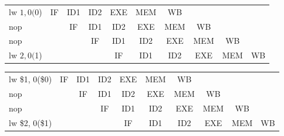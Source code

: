 \documentclass[pdftex,12pt,a4paper]{report}
\begin{document}
\begin{table}[!htb]
\centering
\label{my-label}
\begin{tabular}{lccc|c|c|c|ccc}
\cline{2-7}
\multicolumn{1}{l|}{lw $1, 0($0)} & \multicolumn{1}{c|}{IF} & \multicolumn{1}{c|}{ID1} & ID2 & EXE & \cellcolor[HTML]{F8A102}MEM & \cellcolor[HTML]{FFCC67}WB  &                          &                          &                         \\ \cline{2-8}
nop                               & \multicolumn{1}{c|}{}   & \multicolumn{1}{c|}{IF}  & ID1 & ID2 & EXE                         & MEM                         & \multicolumn{1}{c|}{WB}  &                          &                         \\ \cline{3-9}
nop                               &                         & \multicolumn{1}{c|}{}    & IF  & ID1 & ID2                         & EXE                         & \multicolumn{1}{c|}{MEM} & \multicolumn{1}{c|}{WB}  &                         \\ \cline{4-10} 
lw $2, 0($1)                      &                         &                          &     & IF  & ID1                         & \cellcolor[HTML]{F8A102}ID2 & \multicolumn{1}{c|}{EXE} & \multicolumn{1}{c|}{MEM} & \multicolumn{1}{c|}{WB} \\ \cline{5-10} 
\end{tabular}
\end{table}


\begin{table}[!htb]
\centering
\label{my-label}
\begin{tabular}{lccc|c|c|c|ccc}
\cline{2-7}
\multicolumn{1}{l|}{lw \$1, 0(\$0)} & \multicolumn{1}{c|}{IF} & \multicolumn{1}{c|}{ID1} & ID2 & EXE & \cellcolor[HTML]{F8A102}MEM & \cellcolor[HTML]{FFCC67}WB  &                          &                          &                         \\ \cline{2-8}
nop                               & \multicolumn{1}{c|}{}   & \multicolumn{1}{c|}{IF}  & ID1 & ID2 & EXE                         & MEM                         & \multicolumn{1}{c|}{WB}  &                          &                         \\ \cline{3-9}
nop                               &                         & \multicolumn{1}{c|}{}    & IF  & ID1 & ID2                         & EXE                         & \multicolumn{1}{c|}{MEM} & \multicolumn{1}{c|}{WB}  &                         \\ \cline{4-10} 
lw \$2, 0(\$1)                      &                         &                          &     & IF  & ID1                         & \cellcolor[HTML]{F8A102}ID2 & \multicolumn{1}{c|}{EXE} & \multicolumn{1}{c|}{MEM} & \multicolumn{1}{c|}{WB} \\ \cline{5-10} 
\end{tabular}
\end{table}
\end{document}
